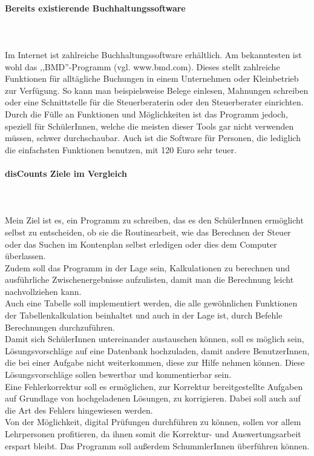 \documentclass[12pt]{report}
\begin{document}
\paragraph{Bereits existierende Buchhaltungssoftware}  

\noindent \\\\Im Internet ist zahlreiche Buchhaltungssoftware erhältlich. Am bekanntesten ist wohl das ,,BMD''-Programm (vgl. www.bmd.com). Dieses stellt zahlreiche Funktionen für alltägliche Buchungen in einem Unternehmen oder Kleinbetrieb zur Verfügung. So kann man beispielsweise Belege einlesen, Mahnungen schreiben oder eine Schnittstelle für die Steuerberaterin oder den Steuerberater einrichten. Durch die Fülle an Funktionen und Möglichkeiten ist das Programm jedoch, speziell für SchülerInnen, welche die meisten dieser Tools gar nicht verwenden müssen, schwer durchschaubar. Auch ist die Software für Personen, die lediglich die einfachsten Funktionen benutzen, mit 120 Euro sehr teuer.  \newline

\paragraph{disCounts Ziele im Vergleich}  

\noindent \\\\Mein Ziel ist es, ein Programm zu schreiben, das es den SchülerInnen ermöglicht selbst zu entscheiden, ob sie die Routinearbeit, wie das Berechnen der Steuer oder das Suchen im Kontenplan selbst erledigen oder dies dem Computer überlassen.\\
Zudem soll das Programm in der Lage sein, Kalkulationen zu berechnen und ausführliche Zwischenergebnisse aufzulisten, damit man die Berechnung leicht nachvollziehen kann.\\
Auch eine Tabelle soll implementiert werden, die alle gewöhnlichen Funktionen der Tabellenkalkulation beinhaltet und auch in der Lage ist, durch Befehle Berechnungen durchzuführen.\\
Damit sich SchülerInnen untereinander austauschen können, soll es möglich sein, Lösungsvorschläge auf eine Datenbank hochzuladen, damit andere BenutzerInnen, die bei einer Aufgabe nicht weiterkommen, diese zur Hilfe nehmen können. Diese Lösungsvorschläge sollen bewertbar und kommentierbar sein.\\
Eine Fehlerkorrektur soll es ermöglichen, zur Korrektur bereitgestellte Aufgaben auf Grundlage von hochgeladenen Lösungen, zu korrigieren. Dabei soll auch auf die Art des Fehlers hingewiesen werden.\\
Von der Möglichkeit, digital Prüfungen durchführen zu können, sollen vor allem Lehrpersonen profitieren, da ihnen somit die Korrektur- und Auswertungsarbeit erspart bleibt. Das Programm soll außerdem SchummlerInnen überführen können.
\end{document}
